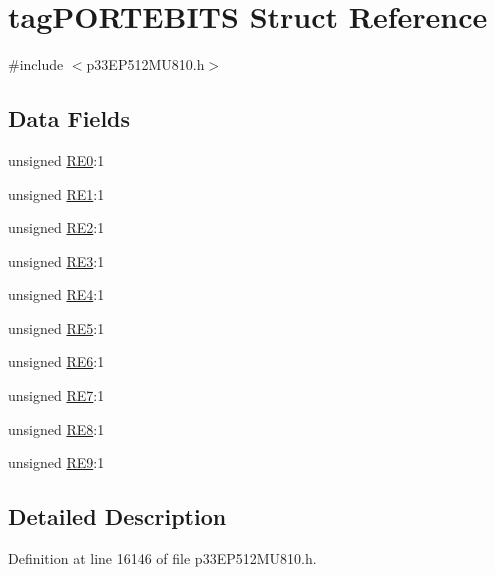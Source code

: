 \hypertarget{structtag_p_o_r_t_e_b_i_t_s}{}\section{tag\+P\+O\+R\+T\+E\+B\+I\+TS Struct Reference}
\label{structtag_p_o_r_t_e_b_i_t_s}


{\ttfamily \#include $<$p33\+E\+P512\+M\+U810.\+h$>$}

\subsection*{Data Fields}
\begin{DoxyCompactItemize}
\item 
unsigned \hyperlink{structtag_p_o_r_t_e_b_i_t_s_a2550355ab8702261c0eb3668ee1a98ca}{R\+E0}\+:1
\item 
unsigned \hyperlink{structtag_p_o_r_t_e_b_i_t_s_ab0941b9fe283ded18d5c458ece7e5da8}{R\+E1}\+:1
\item 
unsigned \hyperlink{structtag_p_o_r_t_e_b_i_t_s_a2c6937b597c6d7f887b9200f199491db}{R\+E2}\+:1
\item 
unsigned \hyperlink{structtag_p_o_r_t_e_b_i_t_s_aa49256e650026bdf0e5a237b1aabdbb9}{R\+E3}\+:1
\item 
unsigned \hyperlink{structtag_p_o_r_t_e_b_i_t_s_a1c3043dfd6718f4b1dc978c3f179c5b5}{R\+E4}\+:1
\item 
unsigned \hyperlink{structtag_p_o_r_t_e_b_i_t_s_ac89aaee0b50b81e43ed779c2c3f2361e}{R\+E5}\+:1
\item 
unsigned \hyperlink{structtag_p_o_r_t_e_b_i_t_s_a02b552f8c8ca18157411915b1dbd63bb}{R\+E6}\+:1
\item 
unsigned \hyperlink{structtag_p_o_r_t_e_b_i_t_s_aa727886dd6491fb841ca0bb362344c65}{R\+E7}\+:1
\item 
unsigned \hyperlink{structtag_p_o_r_t_e_b_i_t_s_a6ee18605deb04aab7975dd55c1382a03}{R\+E8}\+:1
\item 
unsigned \hyperlink{structtag_p_o_r_t_e_b_i_t_s_a7d4c4c6a5f7e90ac8b1924e28beccd7b}{R\+E9}\+:1
\end{DoxyCompactItemize}


\subsection{Detailed Description}


Definition at line 16146 of file p33\+E\+P512\+M\+U810.\+h.



